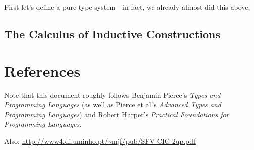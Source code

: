 \documentclass[10pt]{article}
\begin{document}
First let's define a pure type system---in fact, we already almost did this above.

\subsection{The Calculus of Inductive Constructions}

\section{References}


Note that this document roughly follows Benjamin Pierce's \emph{Types and Programming Languages} (as well as Pierce et al.'s \emph{Advanced Types and Programming Languages}) and Robert Harper's \emph{Practical Foundations for Programming Languages}.

Also:
\url{http://www4.di.uminho.pt/~mjf/pub/SFV-CIC-2up.pdf}
\end{document}
